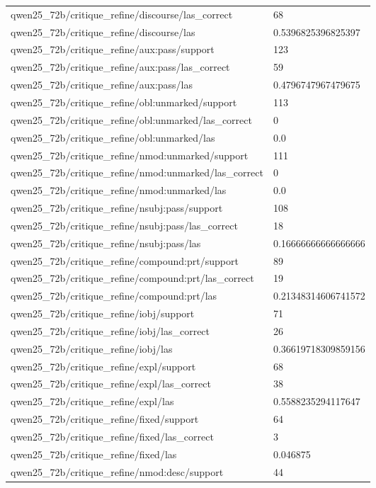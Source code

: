 \begin{tabular}{ll}
qwen25\_72b/critique\_refine/discourse/las\_correct & 68 \\
qwen25\_72b/critique\_refine/discourse/las & 0.5396825396825397 \\
qwen25\_72b/critique\_refine/aux:pass/support & 123 \\
qwen25\_72b/critique\_refine/aux:pass/las\_correct & 59 \\
qwen25\_72b/critique\_refine/aux:pass/las & 0.4796747967479675 \\
qwen25\_72b/critique\_refine/obl:unmarked/support & 113 \\
qwen25\_72b/critique\_refine/obl:unmarked/las\_correct & 0 \\
qwen25\_72b/critique\_refine/obl:unmarked/las & 0.0 \\
qwen25\_72b/critique\_refine/nmod:unmarked/support & 111 \\
qwen25\_72b/critique\_refine/nmod:unmarked/las\_correct & 0 \\
qwen25\_72b/critique\_refine/nmod:unmarked/las & 0.0 \\
qwen25\_72b/critique\_refine/nsubj:pass/support & 108 \\
qwen25\_72b/critique\_refine/nsubj:pass/las\_correct & 18 \\
qwen25\_72b/critique\_refine/nsubj:pass/las & 0.16666666666666666 \\
qwen25\_72b/critique\_refine/compound:prt/support & 89 \\
qwen25\_72b/critique\_refine/compound:prt/las\_correct & 19 \\
qwen25\_72b/critique\_refine/compound:prt/las & 0.21348314606741572 \\
qwen25\_72b/critique\_refine/iobj/support & 71 \\
qwen25\_72b/critique\_refine/iobj/las\_correct & 26 \\
qwen25\_72b/critique\_refine/iobj/las & 0.36619718309859156 \\
qwen25\_72b/critique\_refine/expl/support & 68 \\
qwen25\_72b/critique\_refine/expl/las\_correct & 38 \\
qwen25\_72b/critique\_refine/expl/las & 0.5588235294117647 \\
qwen25\_72b/critique\_refine/fixed/support & 64 \\
qwen25\_72b/critique\_refine/fixed/las\_correct & 3 \\
qwen25\_72b/critique\_refine/fixed/las & 0.046875 \\
qwen25\_72b/critique\_refine/nmod:desc/support & 44 \\

\end{tabular}
